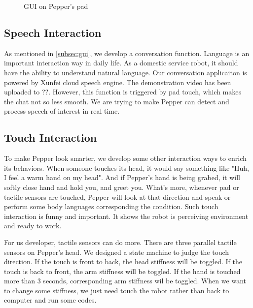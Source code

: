 \begin{figure}[!h]
    \caption{GUI on Pepper's pad}
    
    \label{figb} %
    
    \end{figure}

\subsection{Speech Interaction}
\label{subsec:speech}
As mentioned in \ref{subsec:gui}, we develop a conversation function. 
Language is an important interaction way in daily life.
As a domestic service robot, it should have the ability to understand natural language.
Our conversation applicaiton is powered by Xunfei cloud speech engine.
The demonstration video has been uploaded to ??.
However, this function is triggered by pad touch, which makes the chat not so less smooth.
We are trying to make Pepper can detect and process speech of interest in real time.

\subsection{Touch Interaction}
\label{subsec:otherinteraction}
To make Pepper look smarter, we develop some other interaction ways to enrich its behaviors.
When someone touches its head, it would say something like "Huh, I feel a warm hand on my head".
And if Pepper's hand is being grabed, it will softly close hand and hold you, and greet you.
What's more, whenever pad or tactile sensors are touched, Pepper will look at that direction and speak or perform some body languages corresponding the condition.
Such touch interaction is funny and important.
It shows the robot is perceiving environment and ready to work.

For us developer, tactile sensors can do more.
There are three parallel tactile sensors on Pepper's head.
We designed a state machine to judge the touch direction.
If the touch is front to back, the head stiffness will be toggled.
If the touch is back to front, the arm stiffness will be toggled.
If the hand is touched more than 3 seconds, corresponding arm stiffness wil be toggled.
When we want to change some stiffness, we just need touch the robot rather than back to computer and run some codes.